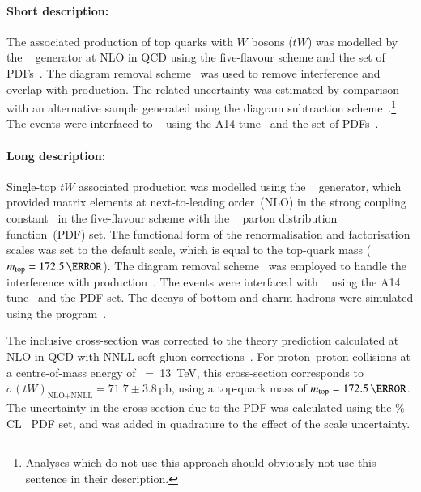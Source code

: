 \paragraph{Short description:}

The associated production of top quarks with $W$ bosons ($tW$) was
modelled by the
\POWHEGBOX[v2]~\cite{Re:2010bp,Nason:2004rx,Frixione:2007vw,Alioli:2010xd}
generator at NLO in QCD using the five-flavour scheme and the
\NNPDF[3.0nlo] set of PDFs~\cite{Ball:2014uwa}.
The diagram removal scheme~\cite{Frixione:2008yi} was used to
remove interference and overlap with \ttbar production. 
The related uncertainty was estimated by comparison with an alternative sample
generated using the diagram subtraction scheme~\cite{Frixione:2008yi,ATL-PHYS-PUB-2016-020}.\footnote{Analyses which do not use this approach 
should obviously not use this sentence in their description.} 
The events were interfaced to \PYTHIA[8.230]~\cite{Sjostrand:2014zea} using the A14
tune~\cite{ATL-PHYS-PUB-2014-021} and the \NNPDF[2.3lo] set of
PDFs~\cite{Ball:2012cx}.



\paragraph{Long description:}

Single-top $tW$ associated production was modelled using the
\POWHEGBOX[v2]~\cite{Re:2010bp,Nason:2004rx,Frixione:2007vw,Alioli:2010xd}
generator, which provided matrix elements at next-to-leading
order~(NLO) in the strong coupling constant \alphas\ in the five-flavour 
scheme with the \NNPDF[3.0nlo]~\cite{Ball:2014uwa} parton
distribution function~(PDF) set.  The functional form of the
renormalisation and factorisation scales was set to the default scale,
which is equal to the top-quark mass ($\mtop = 172.5\,\GeV$).  
The diagram removal scheme~\cite{Frixione:2008yi} was employed to handle the interference
with \ttbar production~\cite{ATL-PHYS-PUB-2016-020}.  The events were
interfaced with \PYTHIA[8.230]~\cite{Sjostrand:2014zea} using the A14
tune~\cite{ATL-PHYS-PUB-2014-021} and the \NNPDF[2.3lo] PDF set.  The
decays of bottom and charm hadrons were simulated using the
\EVTGEN[1.6.0] program~\cite{Lange:2001uf}.

The inclusive cross-section was corrected to the theory prediction
calculated at NLO in QCD with NNLL soft-gluon
corrections~\cite{Kidonakis:2010ux,Kidonakis:2013zqa}.  For proton--proton
collisions at a centre-of-mass energy of \rts~=~\SI{13}{\TeV}, this
cross-section corresponds to $\sigma(tW)_\text{NLO+NNLL}= 71.7\pm3.8$\,pb,
using a top-quark mass of $\mtop = 172.5\,\GeV$.  The uncertainty in
the cross-section due to the PDF was calculated using the \%
CL~\cite{Martin:2009iq,Martin:2009bu} PDF set, and was added in
quadrature to the effect of the scale uncertainty.

